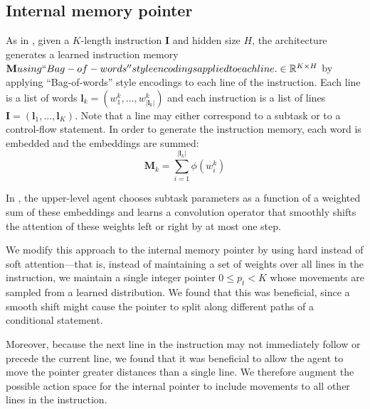 \documentclass{article}
\begin{document}
\subsection{Internal memory pointer}
\label{internal-memory-pointer}
As in \cite{oh2017zero}, given a $K$-length instruction $\mathbf{I}$ and hidden size $H$, the architecture generates a learned instruction memory
$\mathbf{M}using ``Bag-of-words'' style
encodings applied to each line.  \in \mathbb{R}^{K \times H}$ by applying ``Bag-of-words'' style
encodings to each line of the instruction.
Each line is
a list of words $\mathbf{l}_k = \left(w^k_1,\dots,w^k_{|\mathbf{l}_k|}\right)$ and each instruction is
a list of lines $\mathbf{I} = \left(\mathbf{l}_1,\dots,\mathbf{l}_{K}\right)$. Note that a
line may either correspond to a subtask or to a control-flow statement.
In order to generate the instruction memory, each word is embedded and the
embeddings are summed:
\begin{equation}
  \mathbf{M}_k = \sum_{i=1}^{|\mathbf{l}_k|} \phi\left(w^k_i\right)
\end{equation}

In \cite{oh2017zero}, the
upper-level agent chooses 
subtask parameters as a function of a weighted sum of these
embeddings and learns a convolution operator 
that smoothly shifts the attention of these weights left or right by at most one step.

We modify this approach to the internal memory pointer by using hard instead of
soft attention---that is, instead of maintaining a set of weights over all
lines in the instruction, we maintain a single integer pointer $0 \le p_t < K$ 
whose movements are sampled from a learned distribution. We found that this was beneficial, since a smooth shift might
cause the pointer to split along different paths of a conditional statement.

Moreover, because the next line in the instruction may not immediately follow or
precede the current line, we found that it was beneficial to allow the agent to
move the pointer greater distances than a single line. We therefore augment the
possible action space for the internal pointer to include movements to all other
lines in the instruction.
\end{document}
